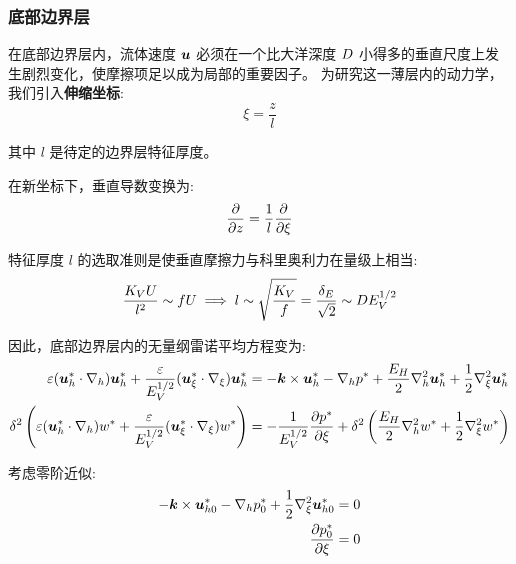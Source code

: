 \subsubsection{底部边界层}

在底部边界层内，流体速度 $\bm{u}$ 必须在一个比大洋深度 $D$ 小得多的垂直尺度上发生剧烈变化，使摩擦项足以成为局部的重要因子。
为研究这一薄层内的动力学，我们引入\textbf{伸缩坐标}:
\begin{equation}
    \xi = \frac{z}{l}
    \label{eq:stretched_coordinate_bottom}
\end{equation}

其中 $l$ 是待定的边界层特征厚度。

在新坐标下，垂直导数变换为:
\begin{equation}
    \pde{}{z} = \frac{1}{l} \pde{}{\xi}
    \label{eq:vertical_derivative_transform_bottom}
\end{equation}

特征厚度 $l$ 的选取准则是使垂直摩擦力与科里奥利力在量级上相当:
\begin{equation*}
    \frac{K_V U}{l^2} \sim f U \implies l \sim \sqrt{\frac{K_V}{f}} = \frac{\delta_E}{\sqrt{2}} \sim D E_V^{1/2}
\end{equation*}

因此，底部边界层内的无量纲雷诺平均方程变为:
\begin{align}
    \ro (\flayer{\vel_h} \cdot \nabla_h) \flayer{\vel_h} + \frac{\ro}{\ev^{1/2}} (\flayer{\vel_\xi} \cdot \nabla_\xi) \flayer{\vel_h} &= -\kvec \times \flayer{\vel_h} -\nabla_h \flayer{\pressure} + \frac{\eh}{2} \nabla_h^2 \flayer{\vel_h} + \frac{1}{2} \nabla_\xi^2 \flayer{\vel_h} \label{eq:rans_nondim_h_boundary_bottom} \\
    \vhratio^2 \left(\ro (\flayer{\vel_h} \cdot \nabla_h) \flayer{w} + \frac{\ro}{\ev^{1/2}} (\flayer{\vel_\xi} \cdot \nabla_\xi) \flayer{w}\right) &= -\frac{1}{\ev^{1/2}} \pde{\flayer{\pressure}}{\xi} + \vhratio^2 \left(\frac{\eh}{2} \nabla_h^2 \flayer{w} + \frac{1}{2} \nabla_\xi^2 \flayer{w}\right) \label{eq:rans_nondim_v_boundary_bottom}
\end{align}

考虑零阶近似:
\begin{align}
    -\kvec \times \flayer{\vel_{h0}} -\nabla_h \flayer{\pressure_0} + \frac{1}{2} \nabla_\xi^2 \flayer{\vel_{h0}} &= 0 \label{eq:momentum_boundary_bottom} \\
    \pde{\flayer{\pressure_0}}{\xi} &= 0 \label{eq:hydrostatic_boundary_bottom}
\end{align}

